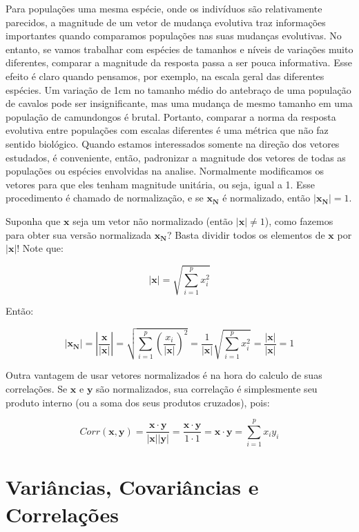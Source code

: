 \documentclass[portuges,]{tufte-handout}
\begin{document}
Para populações uma mesma espécie, onde os indivíduos são relativamente
parecidos, a magnitude de um vetor de mudança evolutiva traz informações
importantes quando comparamos populações nas suas mudanças evolutivas.
No entanto, se vamos trabalhar com espécies de tamanhos e níveis de
variações muito diferentes, comparar a magnitude da resposta passa a ser
pouca informativa. Esse efeito é claro quando pensamos, por exemplo, na
escala geral das diferentes espécies. Um variação de 1cm no tamanho
médio do antebraço de uma população de cavalos pode ser insignificante,
mas uma mudança de mesmo tamanho em uma população de camundongos é
brutal. Portanto, comparar a norma da resposta evolutiva entre
populações com escalas diferentes é uma métrica que não faz sentido
biológico. Quando estamos interessados somente na direção dos vetores
estudados, é conveniente, então, padronizar a magnitude dos vetores de
todas as populações ou espécies envolvidas na analise. Normalmente
modificamos os vetores para que eles tenham magnitude unitária, ou seja,
igual a 1. Esse procedimento é chamado de normalização, e se
\(\mathbf{x_N}\) é normalizado, então \(|\mathbf{x_N}| = 1\).

Suponha que \(\mathbf{x}\) seja um vetor não normalizado (então
\(|\mathbf{x}| \neq 1\)), como fazemos para obter sua versão normalizada
\(\mathbf{x_N}\)? Basta dividir todos os elementos de \(\mathbf{x}\) por
\(|\mathbf{x}|\)! Note que:

\[
|\mathbf{x}| = \sqrt{\sum_{i=1}^p x_i^2}
\]

Então:

\[
|\mathbf{x_N}| = \left| \frac{\mathbf{x}}{|\mathbf{x}|} \right| = \sqrt{\sum_{i=1}^p \left (\frac{x_i}{|\mathbf{x}|} \right )^2} = \frac{1}{|\mathbf{x}|} \sqrt{\sum_{i=1}^p x_i^2} = \frac{|\mathbf{x}|}{|\mathbf{x}|} = 1
\]

Outra vantagem de usar vetores normalizados é na hora do calculo de suas
correlações. Se \(\mathbf{x}\) e \(\mathbf{y}\) são normalizados, sua
correlação é simplesmente seu produto interno (ou a soma dos seus
produtos cruzados), pois:

\[
Corr(\mathbf{x}, \mathbf{y}) = \frac{ \mathbf{x} \cdot \mathbf{y} }{|\mathbf{x}||\mathbf{y}|} = \frac{ \mathbf{x} \cdot \mathbf{y} }{1 \cdot 1} =  \mathbf{x} \cdot \mathbf{y} = \sum_{i=1}^p x_iy_i
\]

\section{Variâncias, Covariâncias e
Correlações}\label{variuxe2ncias-covariuxe2ncias-e-correlauxe7uxf5es}
\end{document}
